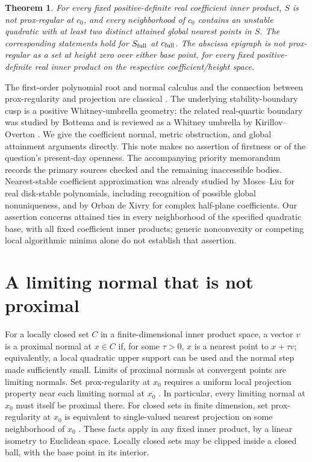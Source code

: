 \documentclass[11pt]{article}
\newtheorem{theorem}{Theorem}
\theoremstyle{remark}\newtheorem{remark}[theorem]{Remark}
\begin{document}
\begin{theorem}\label{thm:main}
For every fixed positive-definite real coefficient inner product, $S$ is not
prox-regular at $c_0$, and every neighborhood of $c_0$ contains an unstable
quadratic with at least two distinct attained global nearest points in $S$.
The corresponding statements hold for $S_{\rm full}$ at $c_{\rm full}$.
The abscissa epigraph is not prox-regular as a set at height zero over either
base point, for every fixed positive-definite real inner product on the
respective coefficient/height space.
\end{theorem}

The first-order polynomial root and normal calculus and the connection between
prox-regularity and projection are classical \cite{BO,Lewis2003,PRT}.
The underlying stability-boundary cusp is a positive Whitney-umbrella geometry;
the related real-quartic boundary was studied by Bottema \cite{Bottema}
and is reviewed as a Whitney umbrella by Kirillov--Overton \cite{KO}.
We give the coefficient normal, metric obstruction, and global
attainment arguments directly. This note makes no assertion of firstness or
of the question's present-day openness. The accompanying priority memorandum
records the primary sources checked and the remaining inaccessible bodies.
Nearest-stable coefficient approximation was already studied by Moses--Liu
\cite{ML} for real disk-stable polynomials, including recognition of possible
global nonuniqueness, and by Orban de Xivry \cite[Chapter~4]{Orban} for complex
half-plane coefficients. Our assertion concerns attained ties in every
neighborhood of the specified quadratic base, with all fixed coefficient
inner products; generic nonconvexity or competing local algorithmic minima
alone do not establish that assertion.

\section{A limiting normal that is not proximal}
For a locally closed set $C$ in a finite-dimensional inner product space,
a vector $v$ is a proximal normal at $x\in C$ if, for some $\tau>0$, $x$ is a
nearest point to $x+\tau v$; equivalently, a local quadratic upper support
can be used and the normal step made sufficiently small. Limits of proximal
normals at convergent points are limiting normals. Set prox-regularity at
$x_0$ requires a uniform local projection property near each limiting normal
at $x_0$ \cite[Definition~1.1 and Proposition~1.2]{PRT}. In particular, every
limiting normal at $x_0$ must itself be proximal there. For closed sets in finite
dimension, set prox-regularity at $x_0$ is equivalent to single-valued nearest
projection on some neighborhood of $x_0$ \cite[Theorem~1.3(a),(k)]{PRT}.
These facts apply in any fixed inner product, by a linear isometry to Euclidean
space. Locally closed sets may be clipped inside a closed ball, with the
base point in its interior.
\end{document}
